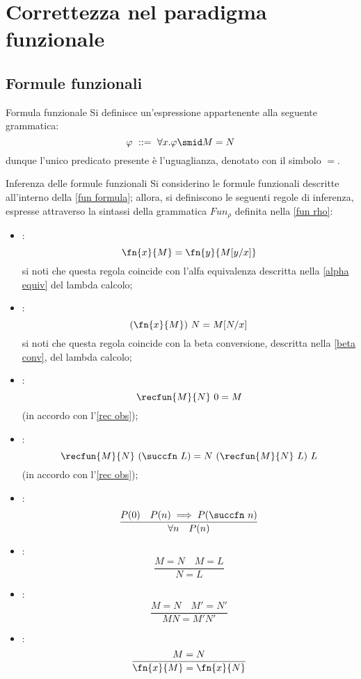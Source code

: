 \documentclass[a4paper, 12pt]{report}
\begin{document}
    \section{Correttezza nel paradigma funzionale}

    \subsection{Formule funzionali}

    \begin{frameddefn}[label={fun formula}]{Formula funzionale}
        Si definisce  un'espressione appartenente alla seguente grammatica: $$\varphi \ ::= \ \forall x.\varphi \smid M = N$$ dunque l'unico predicato presente è l'uguaglianza, denotato con il simbolo $=$.
    \end{frameddefn}

    \begin{framedprop}[breakable]{Inferenza delle formule funzionali}
        Si considerino le formule funzionali descritte all'interno della \cref{fun formula}; allora, si definiscono le seguenti regole di inferenza, espresse attraverso la sintassi della grammatica $Fun_\rho$ definita nella \cref{fun rho}:

        \begin{itemize}
            \item {}: $$\fn{x}{M} = \fn{y}{M[y/x]}$$ si noti che questa regola coincide con l'alfa equivalenza descritta nella \cref{alpha equiv} del lambda calcolo;
            \item {}: $$(\fn{x}{M})\ N = M[N/x]$$ si noti che questa regola coincide con la beta conversione, descritta nella \cref{beta conv}, del lambda calcolo;
            \item {}: $$\recfun{M}{N} \ 0 = M$$ (in accordo con l'\cref{rec obs});
            \item {}: $$\recfun{M}{N} \ (\succfn \ L) = N \ (\recfun{M}{N} \ L) \ L$$ (in accordo con l'\cref{rec obs});
            \item {}: $$\dfrac{P(0) \quad P(n) \implies P(\succfn \ n)}{\forall n \quad P(n)}$$
            \item {}: $$\dfrac{M = N \quad M = L}{N = L}$$
            \item {}: $$\dfrac{M = N \quad M' = N'}{MN = M'N'}$$
            \item {}: $$\dfrac{M= N}{\fn{x}{M} = \fn{x}{N}}$$
        \end{itemize}
    \end{framedprop}
\end{document}
